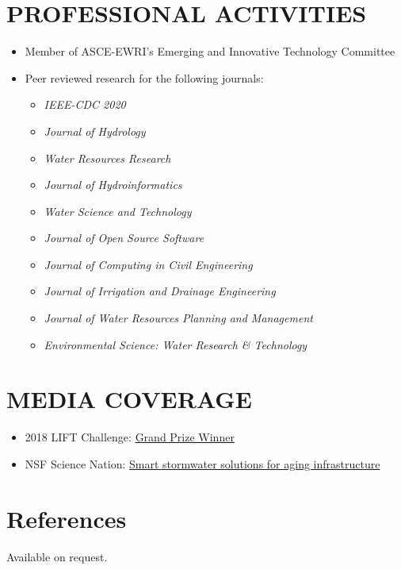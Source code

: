 \documentclass{my_cv}
\begin{document}
\section*{PROFESSIONAL ACTIVITIES}
\begin{itemize}
	\item Member of ASCE-EWRI's Emerging and Innovative Technology Committee
	\item Peer reviewed research for the following journals: 
	\begin{itemize}
		\item \textit{IEEE-CDC 2020}
		\item \textit{Journal of Hydrology}
		\item \textit{Water Resources Research}
		\item \textit{Journal of Hydroinformatics}
		\item \textit{Water Science and Technology}
		\item \textit{Journal of Open Source Software}
		\item \textit{Journal of Computing in Civil Engineering}
		\item \textit{Journal of Irrigation and Drainage Engineering}
		\item \textit{Journal of Water Resources Planning and Management}
		\item \textit{Environmental Science: Water Research \& Technology}
	\end{itemize}
\end{itemize}

\section*{MEDIA COVERAGE}
\begin{itemize}
	\item 2018 LIFT Challenge: \href{https://cee.engin.umich.edu/stories/joint-u-m-and-glwa-team-wins-inaugural-intelligent-water-challenge/}{Grand Prize Winner}
	\item NSF Science Nation: \href{https://www.youtube.com/watch?v=mStPThxAU08}{Smart stormwater solutions for aging infrastructure}
\end{itemize}

\section*{References}
Available on request. 
\end{document}
